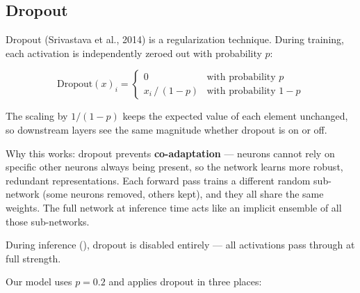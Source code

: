 
\subsection{Dropout}

Dropout (Srivastava et al., 2014) is a regularization technique. During training, each activation is independently zeroed out with probability $p$:

\[\text{Dropout}(x)_i = \begin{cases} 0 & \text{with probability } p \\ x_i \,/\, (1 - p) & \text{with probability } 1 - p \end{cases}\]

The scaling by $1/(1-p)$ keeps the expected value of each element unchanged, so downstream layers see the same magnitude whether dropout is on or off.

Why this works: dropout prevents \textbf{co-adaptation} --- neurons cannot rely on specific other neurons always being present, so the network learns more robust, redundant representations. Each forward pass trains a different random sub-network (some neurons removed, others kept), and they all share the same weights. The full network at inference time acts like an implicit ensemble of all those sub-networks.

During inference (), dropout is disabled entirely --- all activations pass through at full strength.

Our model uses $p = 0.2$ and applies dropout in three places:

